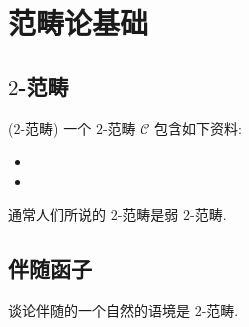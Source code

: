 \chapter{范畴论基础}

\section{$2$-范畴}

\begin{definition}
	{($2$-范畴)}
	一个 $2$-范畴 $\mathcal C$ 包含如下资料:
	\begin{itemize}
		\item 
		\item
	\end{itemize}
	通常人们所说的 $2$-范畴是弱 $2$-范畴.
\end{definition}

\section{伴随函子}

谈论伴随的一个自然的语境是 $2$-范畴.

